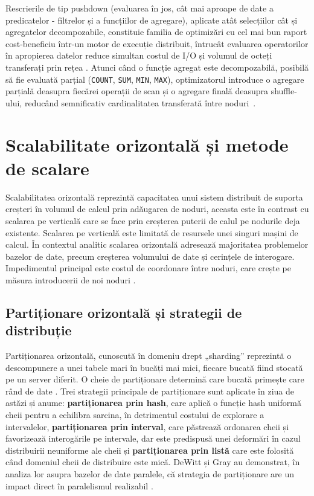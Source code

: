Rescrierile de tip pushdown (evaluarea în jos, cât mai aproape de date a predicatelor - filtrelor și a funcțiilor de agregare), aplicate atât selecțiilor cât și agregatelor decompozabile, constituie familia de optimizări cu cel mai bun raport cost-beneficiu într-un motor de execuție distribuit, întrucât evaluarea operatorilor în apropierea datelor reduce simultan costul de I/O și volumul de octeți transferați prin rețea \cite{chaudhuri1998,hellerstein1998}. Atunci când o funcție agregat este decompozabilă, posibilă să fie evaluată parțial (\texttt{COUNT}, \texttt{SUM}, \texttt{MIN}, \texttt{MAX}), optimizatorul introduce o agregare parțială deasupra fiecărei operații de scan și o agregare finală deasupra shuffle-ului, reducând semnificativ cardinalitatea transferată între noduri~\cite{graefe1993query,yan1995}.

\section{Scalabilitate orizontală și metode de scalare}

Scalabilitatea orizontală reprezintă capacitatea unui sistem distribuit de suporta creșteri în volumul de calcul prin adăugarea de noduri, aceasta este în contrast cu scalarea pe verticală care se face prin creșterea puterii de calul pe nodurile deja existente. Scalarea pe verticală este limitată de resursele unei singuri mașini de calcul. În contextul analitic scalarea orizontală adresează majoritatea problemelor bazelor de date, precum creșterea volumului de date și cerințele de interogare. Impedimentul principal este costul de coordonare între noduri, care crește pe măsura introducerii de noi noduri \cite{ozsu2019}.

\subsection{Partiționare orizontală și strategii de distribuție}

Partiționarea orizontală, cunoscută în domeniu drept „sharding” reprezintă o descompunere a unei tabele mari în bucăți mai mici, fiecare bucată fiind stocată pe un server diferit. O cheie de partiționare determină care bucată primește care rând de date \cite{ozsu2019}. Trei strategii principale de partiționare sunt aplicate în ziua de astăzi și anume: \textbf{partiționarea prin hash}, care aplică o funcție hash uniformă cheii pentru a echilibra sarcina, în detrimentul costului de explorare a intervalelor, \textbf{partiționarea prin interval}, care păstrează ordonarea cheii și favorizează interogările pe intervale, dar este predispusă unei deformări în cazul distribuirii neuniforme ale cheii și \textbf{partiționarea prin listă} care este folosită când domeniul cheii de distribuire este mică. DeWitt și Gray au demonstrat, în analiza lor asupra bazelor de date paralele, că strategia de partiționare are un impact direct în paralelismul realizabil \cite{dewitt1992}.

